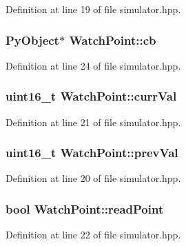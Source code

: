 Definition at line 19 of file simulator.\-hpp.

\hypertarget{struct_watch_point_a5f41744f900b3b33e6585bb906e8da25}{
\subsubsection[{cb}]{\setlength{\rightskip}{0pt plus 5cm}Py\-Object$\ast$ Watch\-Point\-::cb}}\label{struct_watch_point_a5f41744f900b3b33e6585bb906e8da25}


Definition at line 24 of file simulator.\-hpp.

\hypertarget{struct_watch_point_a034305370c1f202264bde15517161c84}{
\subsubsection[{curr\-Val}]{\setlength{\rightskip}{0pt plus 5cm}uint16\-\_\-t Watch\-Point\-::curr\-Val}}\label{struct_watch_point_a034305370c1f202264bde15517161c84}


Definition at line 21 of file simulator.\-hpp.

\hypertarget{struct_watch_point_a10522099ca18d8990ed7271eea8ebe9b}{
\subsubsection[{prev\-Val}]{\setlength{\rightskip}{0pt plus 5cm}uint16\-\_\-t Watch\-Point\-::prev\-Val}}\label{struct_watch_point_a10522099ca18d8990ed7271eea8ebe9b}


Definition at line 20 of file simulator.\-hpp.

\hypertarget{struct_watch_point_a861bd06fdc7d1344facc41e7c338eb0a}{
\subsubsection[{read\-Point}]{\setlength{\rightskip}{0pt plus 5cm}bool Watch\-Point\-::read\-Point}}\label{struct_watch_point_a861bd06fdc7d1344facc41e7c338eb0a}


Definition at line 22 of file simulator.\-hpp.

